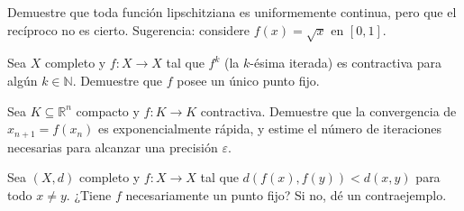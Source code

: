 \begin{exercise}
Demuestre que toda función lipschitziana es uniformemente continua, pero que el recíproco no es cierto. Sugerencia: considere $f(x)=\sqrt{x}$ en $[0,1]$.
\end{exercise}

\begin{exercise}
Sea $X$ completo y $f\colon X\to X$ tal que $f^k$ (la $k$-ésima iterada) es contractiva para algún $k\in\mathbb{N}$. Demuestre que $f$ posee un único punto fijo.
\end{exercise}

\begin{exercise}
Sea $K\subseteq\mathbb{R}^n$ compacto y $f\colon K\to K$ contractiva. Demuestre que la convergencia de $x_{n+1}=f(x_n)$ es exponencialmente rápida, y estime el número de iteraciones necesarias para alcanzar una precisión $\varepsilon$.
\end{exercise}

\begin{problem}
Sea $(X,d)$ completo y $f\colon X\to X$ tal que $d(f(x),f(y))<d(x,y)$ para todo $x\neq y$. ¿Tiene $f$ necesariamente un punto fijo? Si no, dé un contraejemplo.
\end{problem}
